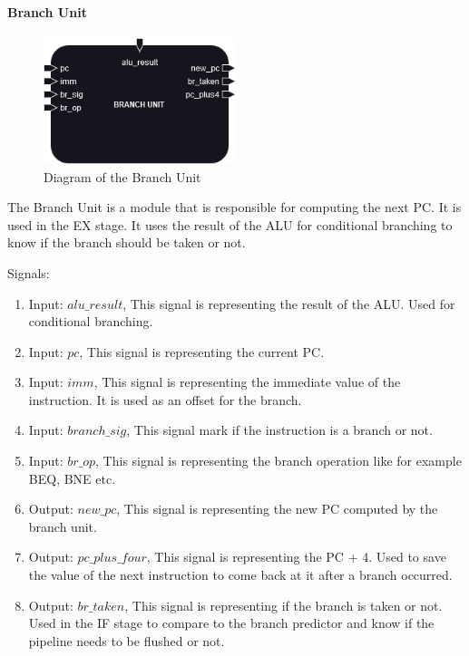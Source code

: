 \paragraph{Branch Unit}

\begin{figure}[H]
    \centering
    \includegraphics[width=0.5\textwidth]{design/pipelined/execute/images/br_unit.png}
    \caption{Diagram of the Branch Unit}
    \label{fig:br_unit}
\end{figure}

The Branch Unit is a module that is responsible for computing the next PC. It is used in the EX stage. It uses the result of the ALU
for conditional branching to know if the branch should be taken or not.

Signals:
\begin{enumerate}[label={\textbullet}]
    \item Input: $alu\_result$, This signal is representing the result of the ALU. Used for conditional branching.
    \item Input: $pc$, This signal is representing the current PC.
    \item Input: $imm$, This signal is representing the immediate value of the instruction. It is used as an offset for the branch.
    \item Input: $branch\_sig$, This signal mark if the instruction is a branch or not.
    \item Input: $br\_op$, This signal is representing the branch operation like for example BEQ, BNE etc.
    \item Output: $new\_pc$, This signal is representing the new PC computed by the branch unit.
    \item Output: $pc\_plus\_four$, This signal is representing the PC + 4. Used to save the value of the next instruction 
    to come back at it after a branch occurred.
    \item Output: $br\_taken$, This signal is representing if the branch is taken or not. Used in the IF stage to compare 
    to the branch predictor and know if the pipeline needs to be flushed or not.
\end{enumerate}